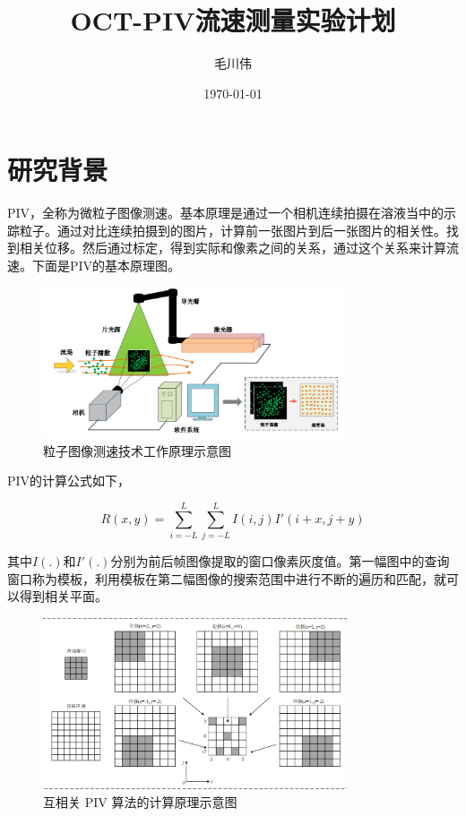 \documentclass[12pt]{article}
\title{OCT-PIV流速测量实验计划}
\author{毛川伟}
\date{\today}
\begin{document}
\maketitle

\section{研究背景}

PIV，全称为微粒子图像测速。基本原理是通过一个相机连续拍摄在溶液当中的示踪粒子。通过对比连续拍摄到的图片，计算前一张图片到后一张图片的相关性。找到相关位移。然后通过标定，得到实际和像素之间的关系，通过这个关系来计算流速。下面是PIV的基本原理图。

\begin{figure}[H] %
    \centering
    \includegraphics[width=0.8\textwidth]{Images/PIV_principles.png}
    \caption{粒子图像测速技术工作原理示意图}
\end{figure}

PIV的计算公式如下，

\begin{equation}
    R(x,y)=\sum_{i=-L}^L\sum_{j=-L}^LI(i,j)I'(i+x,j+y)
\end{equation}

其中$I(.)$和$I'(.)$分别为前后帧图像提取的窗口像素灰度值。第一幅图中的查询窗口称为模板，利用模板在第二幅图像的搜索范围中进行不断的遍历和匹配，就可以得到相关平面。

\begin{figure}[H]
    \centering
    \includegraphics[width=0.8\textwidth]{Images/互相关算法示意图.png}
    \caption{互相关 PIV 算法的计算原理示意图}
\end{figure}
\end{document}
